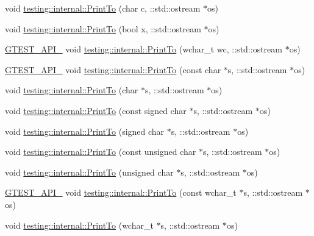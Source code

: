 \begin{DoxyCompactItemize}
\item 
void \mbox{\hyperlink{namespacetesting_1_1internal_a476bd3d411d4f129620aaf8999c257c0}{testing\+::internal\+::\+Print\+To}} (char c, \+::std\+::ostream $\ast$os)
\item 
void \mbox{\hyperlink{namespacetesting_1_1internal_a2979ac1ad3e05c51dcd7dca2eb34e6ce}{testing\+::internal\+::\+Print\+To}} (bool x, \+::std\+::ostream $\ast$os)
\item 
\mbox{\hyperlink{gtest-port_8h_aa73be6f0ba4a7456180a94904ce17790}{G\+T\+E\+S\+T\+\_\+\+A\+P\+I\+\_\+}} void \mbox{\hyperlink{namespacetesting_1_1internal_a6c50fd437a2ae2ff6f182ccd6c2744dd}{testing\+::internal\+::\+Print\+To}} (wchar\+\_\+t wc, \+::std\+::ostream $\ast$os)
\item 
\mbox{\hyperlink{gtest-port_8h_aa73be6f0ba4a7456180a94904ce17790}{G\+T\+E\+S\+T\+\_\+\+A\+P\+I\+\_\+}} void \mbox{\hyperlink{namespacetesting_1_1internal_ac226053b96d7d61f9407e3b75bab07d9}{testing\+::internal\+::\+Print\+To}} (const char $\ast$s, \+::std\+::ostream $\ast$os)
\item 
void \mbox{\hyperlink{namespacetesting_1_1internal_a553eec7bb50de01c9e91cac4accc606f}{testing\+::internal\+::\+Print\+To}} (char $\ast$s, \+::std\+::ostream $\ast$os)
\item 
void \mbox{\hyperlink{namespacetesting_1_1internal_a792cc5665a34619ed7a6d54711433456}{testing\+::internal\+::\+Print\+To}} (const signed char $\ast$s, \+::std\+::ostream $\ast$os)
\item 
void \mbox{\hyperlink{namespacetesting_1_1internal_a1320096b116f8cc4b688acbd5b783051}{testing\+::internal\+::\+Print\+To}} (signed char $\ast$s, \+::std\+::ostream $\ast$os)
\item 
void \mbox{\hyperlink{namespacetesting_1_1internal_a42c591f2164ad105b502a9262333aed2}{testing\+::internal\+::\+Print\+To}} (const unsigned char $\ast$s, \+::std\+::ostream $\ast$os)
\item 
void \mbox{\hyperlink{namespacetesting_1_1internal_a7fae797c500d66d0f5a9db4f205e3416}{testing\+::internal\+::\+Print\+To}} (unsigned char $\ast$s, \+::std\+::ostream $\ast$os)
\item 
\mbox{\hyperlink{gtest-port_8h_aa73be6f0ba4a7456180a94904ce17790}{G\+T\+E\+S\+T\+\_\+\+A\+P\+I\+\_\+}} void \mbox{\hyperlink{namespacetesting_1_1internal_afb038075e9e2166d1d9158a19e0eed23}{testing\+::internal\+::\+Print\+To}} (const wchar\+\_\+t $\ast$s, \+::std\+::ostream $\ast$os)
\item 
void \mbox{\hyperlink{namespacetesting_1_1internal_a8d41baa371fad3eb5a3dbe1bbc02c290}{testing\+::internal\+::\+Print\+To}} (wchar\+\_\+t $\ast$s, \+::std\+::ostream $\ast$os)

\end{DoxyCompactItemize}
